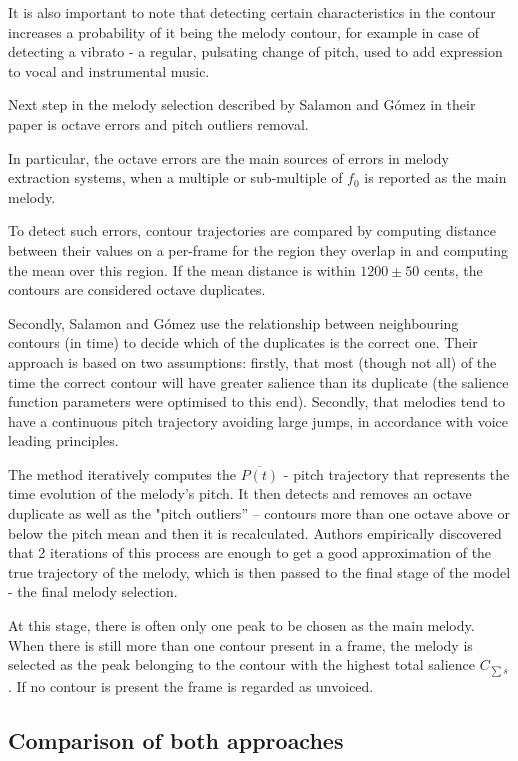 It is also important to note that detecting certain characteristics in the contour increases a probability of it being the melody contour, for example in case of detecting a vibrato -  a regular, pulsating change of pitch, used to add expression to vocal and instrumental music. \cite{vibrato}

Next step in the melody selection described by Salamon and G\'{o}mez in their paper is octave errors and pitch outliers removal.  

In particular, the octave errors are the main sources of errors in melody extraction systems, when a multiple or sub-multiple of $f_{0}$ is reported as the main melody. 

To detect such errors, contour trajectories are compared by computing distance between their values on a per-frame for the region they overlap in and computing the mean over this region.
If the mean distance is within $1200\pm50$ cents, the contours are considered octave duplicates.

Secondly, Salamon and G\'{o}mez use the relationship between neighbouring contours (in time) to decide which of the duplicates is the correct one. Their approach is based on two assumptions: firstly, that most (though not all) of the time the correct contour will have greater salience than its duplicate (the salience function parameters were optimised to this end). Secondly, that melodies tend to have a continuous pitch trajectory avoiding large jumps, in accordance with voice leading principles.

The method iteratively computes the $\overline{P(t)}$ - pitch trajectory that represents the time evolution of the melody's pitch.
It then detects and removes an octave duplicate as well as  the "pitch outliers” – contours more than one octave above or below the pitch mean and then it is recalculated. Authors empirically discovered that 2 iterations of this process are enough to get a good approximation of the true trajectory of the melody, which is then passed to the final stage of the model - the final melody selection.

At this stage, there is often only one peak to be chosen as the main melody. When there is still more than one contour present in a frame, the melody is selected as the peak belonging to the contour with the highest total salience $C_{\sum s}$. If no contour is present the frame is regarded as unvoiced.

\vspace{10pt}


\subsection{Comparison of both approaches}

